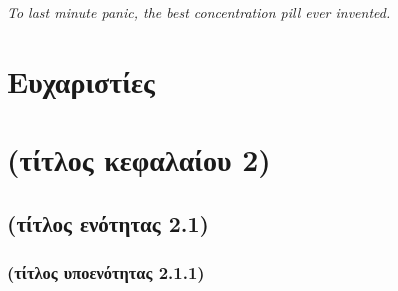 \documentclass[12pt]{report}
\begin{document}
\setcounter{page}{2}


\chapter*{}
\thispagestyle{plain} \null
\vfill
\begin{flushright}
	\textit{To last minute panic, the best concentration pill ever invented.}
	\par\medskip
\end{flushright}
\vfill\vfill






\chapter*{Ευχαριστίες}


\tableofcontents
\thispagestyle{plain}


\listoffigures
\thispagestyle{plain}


\listoftables


\digital
{}
\else
{}
\fi





%



\chapter{(τίτλος κεφαλαίου 2)}



\section{(τίτλος ενότητας 2.1)}


\subsection{(τίτλος υποενότητας 2.1.1)}




\cite{*}

\end{document}
